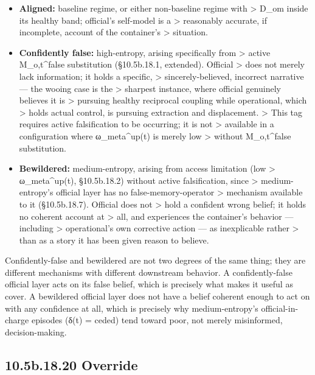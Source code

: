 \documentclass[
]{article}
\begin{document}
\begin{itemize}
\item
  \textbf{Aligned:} baseline regime, or either non-baseline regime with
  \textgreater{} D\_om inside its healthy band; official's self-model is
  a \textgreater{} reasonably accurate, if incomplete, account of the
  container's \textgreater{} situation.
\item
  \textbf{Confidently false:} high-entropy, arising specifically from
  \textgreater{} active M\_o,t\^{}false substitution (§10.5b.18.1,
  extended). Official \textgreater{} does not merely lack information;
  it holds a specific, \textgreater{} sincerely-believed, incorrect
  narrative --- the wooing case is the \textgreater{} sharpest instance,
  where official genuinely believes it is \textgreater{} pursuing
  healthy reciprocal coupling while operational, which \textgreater{}
  holds actual control, is pursuing extraction and displacement.
  \textgreater{} This tag requires active falsification to be occurring;
  it is not \textgreater{} available in a configuration where
  ω\_meta\^{}up(t) is merely low \textgreater{} without M\_o,t\^{}false
  substitution.
\item
  \textbf{Bewildered:} medium-entropy, arising from access limitation
  (low \textgreater{} ω\_meta\^{}up(t), §10.5b.18.2) without active
  falsification, since \textgreater{} medium-entropy's official layer
  has no false-memory-operator \textgreater{} mechanism available to it
  (§10.5b.18.7). Official does not \textgreater{} hold a confident wrong
  belief; it holds no coherent account at \textgreater{} all, and
  experiences the container's behavior --- including \textgreater{}
  operational's own corrective action --- as inexplicable rather
  \textgreater{} than as a story it has been given reason to believe.
\end{itemize}

Confidently-false and bewildered are not two degrees of the same thing;
they are different mechanisms with different downstream behavior. A
confidently-false official layer acts on its false belief, which is
precisely what makes it useful as cover. A bewildered official layer
does not have a belief coherent enough to act on with any confidence at
all, which is precisely why medium-entropy's official-in-charge episodes
(δ(t) = ceded) tend toward poor, not merely misinformed,
decision-making.

\hypertarget{b.18.20-override}{%
\subsection{10.5b.18.20 Override}\label{b.18.20-override}}
\end{document}
